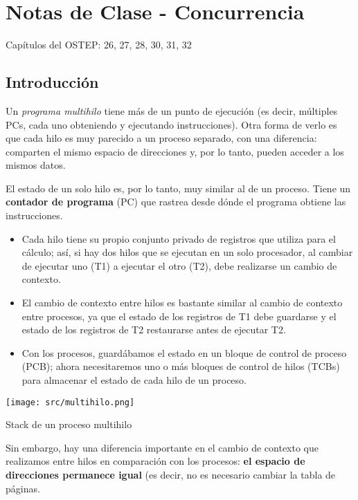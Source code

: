 \documentclass[openany]{book}
\begin{document}
\chapter{Notas de Clase - Concurrencia}

\begin{tcolorbox}[colback=black!5!white,colframe=black!75!black]
    Capítulos del OSTEP: 26, 27, 28, 30, 31, 32
\end{tcolorbox}

\section{Introducción}
Un \textit{programa multihilo} tiene más de un punto de ejecución (es decir, múltiples PCs, cada uno obteniendo y ejecutando instrucciones). Otra forma de verlo es que cada hilo es muy parecido a un proceso separado, con una diferencia: comparten el mismo espacio de direcciones y, por lo tanto, pueden acceder a los mismos datos.

El estado de un solo hilo es, por lo tanto, muy similar al de un proceso. Tiene un \textbf{contador de programa} (PC) que rastrea desde dónde el programa obtiene las instrucciones. 
\begin{itemize}
    \item Cada hilo tiene su propio conjunto privado de registros que utiliza para el cálculo; así, si hay dos hilos que se ejecutan en un solo procesador, al cambiar de ejecutar uno (T1) a ejecutar el otro (T2), debe realizarse un cambio de contexto.
    \item El cambio de contexto entre hilos es bastante similar al cambio de contexto entre procesos, ya que el estado de los registros de T1 debe guardarse y el estado de los registros de T2 restaurarse antes de ejecutar T2.
    \item Con los procesos, guardábamos el estado en un bloque de control de proceso (PCB); ahora necesitaremos uno o más bloques de control de hilos (TCBs) para almacenar el estado de cada hilo de un proceso. 
\end{itemize}

\begin{floatingfigure}[r]{0.5\textwidth}
    \texttt{[image: src/multihilo.png]}
    \caption{Stack de un proceso multihilo}
\end{floatingfigure}

Sin embargo, hay una diferencia importante en el cambio de contexto que realizamos entre hilos en comparación con los procesos: \textbf{el espacio de direcciones permanece igual} (es decir, \newline \colorbox{blue!20}{no es necesario cambiar la tabla de páginas}.
\end{document}
